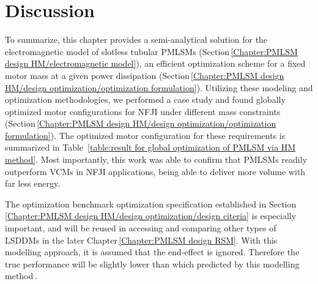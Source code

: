     \section{Discussion}                            \label{Chapter:PMLSM design HM/discussion}
    
        
        To summarize, this chapter provides a semi-analytical solution for the electromagnetic model of slotless tubular \acsp{PMLSM} (Section\,\ref{Chapter:PMLSM design HM/electromagnetic model}), an efficient optimization scheme for a fixed motor mass at a given power dissipation (Section\,\ref{Chapter:PMLSM design HM/design optimization/optimization formulation}). Utilizing these modeling and optimization methodologies, we performed a case study and found globally optimized motor configurations for \acs{NFJI} under different mass constraints (Section\,\ref{Chapter:PMLSM design HM/design optimization/optimization formulation}). The optimized motor configuration for these requirements is summarized in Table~\ref{table:result for global optimization of PMLSM via HM method}. Most importantly, this work was able to confirm that \acsp{PMLSM} readily outperform \acsp{VCM} in \acs{NFJI} applications, being able to deliver more volume with far less energy. 
        
        
        The optimization benchmark optimization specification established in Section\,\ref{Chapter:PMLSM design HM/design optimization/design citeria} is especially important, and will be reused in accessing and comparing other types of \acsp{LSDDM} in the later Chapter\,\ref{Chapter:PMLSM design RSM}. With this modelling approach, it is assumed that the end-effect is ignored. Therefore the true performance will be slightly lower than which predicted by this modelling method\,\cite{Ruddy2013APerformance}.
        
        